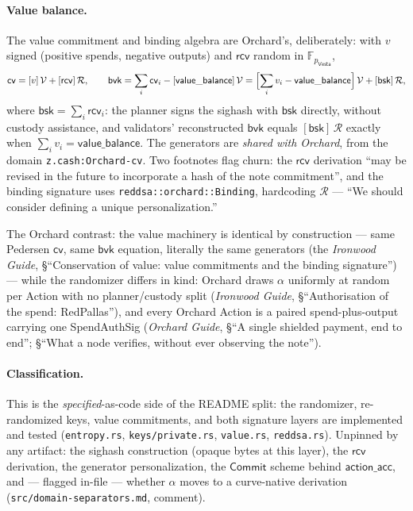 \documentclass[11pt,a4paper]{article}
\theoremstyle{definition}
\newcommand{\F}{\mathbb{F}}
\newcommand{\Comm}{\mathsf{Commit}}
\newcommand{\cvsym}{\mathsf{cv}}
\newcommand{\Vesta}{\ensuremath{\mathsf{Vesta}}}
\newcommand{\rcv}{\ensuremath{\mathsf{rcv}}}
\begin{document}
\paragraph{Value balance.} The value commitment and binding algebra are
Orchard's, deliberately: with $v$ signed (positive spends, negative
outputs) and $\rcv$ random in $\F_{p_{\Vesta}}$,
\[
\cvsym = [v]\,\mathcal{V} + [\rcv]\,\mathcal{R}, \qquad
\mathsf{bvk} = \sum_i \cvsym_i - [\mathsf{value\_balance}]\,\mathcal{V}
 = \Bigl[\sum_i v_i - \mathsf{value\_balance}\Bigr]\,\mathcal{V}
   + [\mathsf{bsk}]\,\mathcal{R},
\]
where $\mathsf{bsk} = \sum_i \rcv_i$: the planner signs the sighash with
$\mathsf{bsk}$ directly, without custody assistance, and validators'
reconstructed $\mathsf{bvk}$ equals $[\mathsf{bsk}]\,\mathcal{R}$ exactly
when $\sum_i v_i = \mathsf{value\_balance}$. The generators are
\emph{shared with Orchard}, from the domain \texttt{z.cash:Orchard-cv}.
Two footnotes flag churn: the $\rcv$ derivation ``may be revised in the
future to incorporate a hash of the note commitment'', and the binding
signature uses \texttt{reddsa::orchard::Binding}, hardcoding $\mathcal{R}$
--- ``We should consider defining a unique personalization.''

The Orchard contrast: the value machinery is identical by construction ---
same Pedersen $\cvsym$, same $\mathsf{bvk}$ equation, literally the same
generators (the \emph{Ironwood Guide}, \S``Conservation of value: value
commitments and the binding signature'') --- while the randomizer differs
in kind: Orchard draws $\alpha$ uniformly at random per Action with no
planner/custody split (\emph{Ironwood Guide}, \S``Authorisation of the
spend: RedPallas''), and every Orchard Action is a paired
spend-plus-output carrying one \textsf{SpendAuthSig} (\emph{Orchard
Guide}, \S``A single shielded payment, end to end''; \S``What a node
verifies, without ever observing the note'').

\paragraph{Classification.} This is the \emph{specified}-as-code side of
the README split: the randomizer, re-randomized keys, value commitments,
and both signature layers are implemented and tested (\texttt{entropy.rs},
\texttt{keys/private.rs}, \texttt{value.rs}, \texttt{reddsa.rs}). Unpinned
by any artifact: the sighash construction (opaque bytes at this layer),
the $\rcv$ derivation, the generator personalization, the $\Comm$ scheme
behind $\mathsf{action\_acc}$, and --- flagged in-file --- whether
$\alpha$ moves to a curve-native derivation
(\texttt{src/domain-separators.md}, comment).
\end{document}
